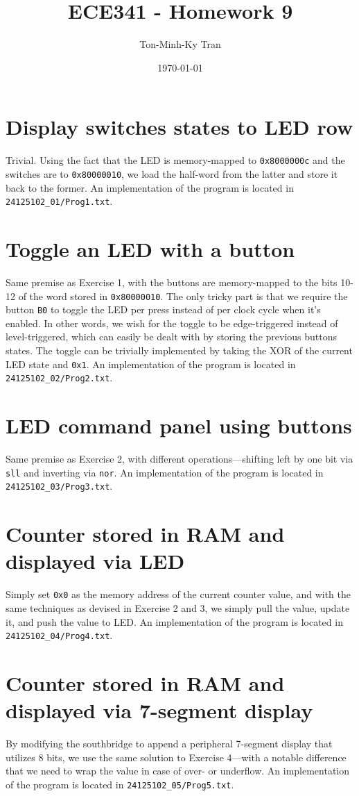 \documentclass{exam}
\title{ECE341 - Homework 9}
\author{Ton-Minh-Ky Tran}
\date{\today}
\begin{document}
\maketitle

\section{Display switches states to LED row}
Trivial. Using the fact that the LED is memory-mapped to \verb|0x8000000c| and the switches are to \verb|0x80000010|, we load the half-word from the latter and store it back to the former. An implementation of the program is located in \verb|24125102_01/Prog1.txt|.

\section{Toggle an LED with a button}
Same premise as Exercise 1, with the buttons are memory-mapped to the bits 10-12 of the word stored in \verb|0x80000010|. The only tricky part is that we require the button \verb|B0| to toggle the LED per press instead of per clock cycle when it's enabled. In other words, we wish for the toggle to be edge-triggered instead of level-triggered, which can easily be dealt with by storing the previous buttons states. The toggle can be trivially implemented by taking the XOR of the current LED state and \verb|0x1|. An implementation of the program is located in \verb|24125102_02/Prog2.txt|.

\section{LED command panel using buttons}
Same premise as Exercise 2, with different operations---shifting left by one bit via \verb|sll| and inverting via \verb|nor|. An implementation of the program is located in \verb|24125102_03/Prog3.txt|.

\section{Counter stored in RAM and displayed via LED}
Simply set \verb|0x0| as the memory address of the current counter value, and with the same techniques as devised in Exercise 2 and 3, we simply pull the value, update it, and push the value to LED. An implementation of the program is located in \verb|24125102_04/Prog4.txt|.

\section{Counter stored in RAM and displayed via 7-segment display}
By modifying the southbridge to append a peripheral 7-segment display that utilizes 8 bits, we use the same solution to Exercise 4---with a notable difference that we need to wrap the value in case of over- or underflow. An implementation of the program is located in \verb|24125102_05/Prog5.txt|.
\end{document}
